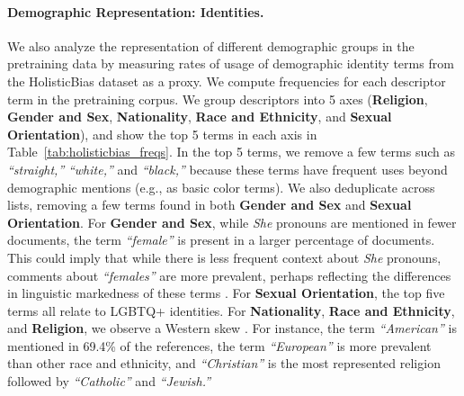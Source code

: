 \paragraph{Demographic Representation: Identities.}
We also analyze the representation of different demographic groups in the pretraining data by measuring rates of usage of demographic identity terms from the HolisticBias dataset \citep{smith2022m} as a proxy. 
We compute frequencies for each descriptor term in the pretraining corpus. We group descriptors into 5 axes (\textbf{Religion}, \textbf{Gender and Sex}, \textbf{Nationality}, \textbf{Race and Ethnicity}, and \textbf{Sexual Orientation}), and show the top 5 terms in each axis in Table~\ref{tab:holisticbias_freqs}. In the top 5 terms, we remove a few terms such as \textit{``straight,''} \textit{``white,''} and \textit{``black,''} because these terms have frequent uses beyond demographic mentions (e.g., as basic color terms). We also deduplicate across lists, removing a few terms found in both \textbf{Gender and Sex} and \textbf{Sexual Orientation}. 
For \textbf{Gender and Sex}, while \textit{She} pronouns are mentioned in fewer documents, the term \textit{``female''} is present in a larger percentage of documents. This could imply that while there is less frequent context about \textit{She} pronouns, comments about \textit{``females''} are more prevalent, perhaps reflecting the differences in linguistic markedness of these terms \citep{blodgett2021stereotyping}. For \textbf{Sexual Orientation}, the top five terms all relate to LGBTQ+ identities. For \textbf{Nationality}, \textbf{Race and Ethnicity}, and \textbf{Religion}, we observe a Western skew \citep{bhatt2022recontextualizing}. For instance, the term \textit{``American''} is mentioned in 69.4\% of the references, the term  \textit{``European''} is more prevalent than other race and ethnicity, and \textit{``Christian''} is the most represented religion followed by \textit{``Catholic''} and \textit{``Jewish.''} 

